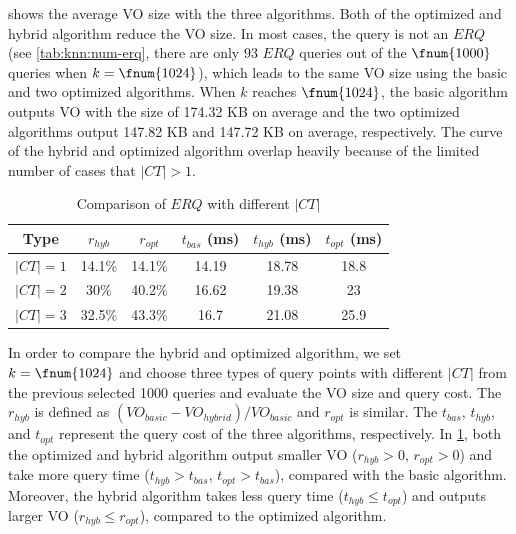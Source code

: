  shows the average VO size with the three algorithms. Both of the optimized and hybrid algorithm reduce the VO size. In most cases, the query is not an $ERQ$ (see \cref{tab:knn:num-erq}, there are only $93$ $ERQ$ queries out of the $\fnum{1000}$ queries when $k=\fnum{1024}$), which leads to the same VO size using the basic and two optimized algorithms. When $k$ reaches $\fnum{1024}$, the basic algorithm outputs VO with the size of 174.32 KB on average and the two optimized algorithms output 147.82 KB and 147.72 KB on average, respectively. The curve of the hybrid and optimized algorithm overlap heavily because of the limited number of cases that $|CT|>1$.

\begin{table}[t]
  \centering
  \begin{tabular}{cccccc}
    \toprule
    Type   & $r_{hyb}$ & $r_{opt}$ & $t_{bas}$ (ms) & $t_{hyb}$ (ms) & $t_{opt}$ (ms) \\
    \midrule
    $|CT|=1$ & 14.1\%              & 14.1\%                 & 14.19      & 18.78       & 18.8           \\
    $|CT|=2$ & 30\%                & 40.2\%                 & 16.62      & 19.38       & 23             \\
    $|CT|=3$ & 32.5\%              & 43.3\%                 & 16.7       & 21.08       & 25.9           \\
    \bottomrule
  \end{tabular}
  \caption{Comparison of $ERQ$ with different $|CT|$}\label{tab:knn:erq-ct}
\end{table}

In order to compare the hybrid and optimized algorithm, we set $k=\fnum{1024}$ and choose three types of query points with different $|CT|$ from the previous selected 1000 queries and evaluate the VO size and query cost. The $r_{hyb}$ is defined as ${(VO_{basic}-VO_{hybrid})}/{VO_{basic}}$ and $r_{opt}$ is similar. The $t_{bas}$, $t_{hyb}$, and $t_{opt}$ represent the query cost of the three algorithms, respectively. In \cref{tab:knn:erq-ct}, both the optimized and hybrid algorithm output smaller VO ($r_{hyb}>0$, $r_{opt}>0$) and take more query time ($t_{hyb}>t_{bas}$, $t_{opt}>t_{bas}$), compared with the basic algorithm. Moreover, the hybrid algorithm takes less query time ($t_{hyb}\le t_{opt}$) and outputs larger VO ($r_{hyb}\le r_{opt}$), compared to the optimized algorithm.

